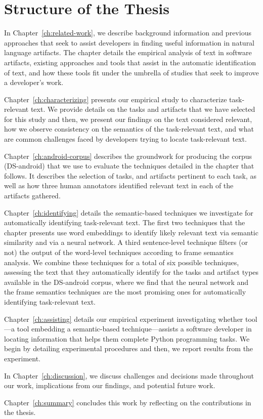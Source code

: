\section{Structure of the Thesis}
\label{cp1:organization}


In Chapter~\ref{ch:related-work}, we describe background information 
and previous approaches that seek to assist developers in 
finding useful information in natural language artifacts. 
The chapter details 
the empirical analysis of text in software artifacts, existing approaches and tools 
that assist in the automatic
identification of text, and how these tools fit under the 
umbrella of studies that seek to 
improve a developer's work.


Chapter~\ref{ch:characterizing} presents our empirical study to characterize task-relevant text.
We provide details on the tasks and artifacts that we have selected for this study
and then, we present our findings on the text considered relevant, 
how we observe consistency on the semantics of the task-relevant text,
and what are common challenges faced by developers trying to locate task-relevant text.


Chapter~\ref{ch:android-corpus} describes the groundwork 
for producing the corpus (\acs{DS-android}) that we use to evaluate the techniques 
detailed in the chapter that follows. It describes the selection of tasks, 
and 
artifacts pertinent to each task,
as well as how three human annotators identified relevant text in each of the artifacts gathered.



Chapter~\ref{ch:identifying} details the semantic-based techniques we investigate for automatically 
identifying task-relevant text.
The first two techniques that the chapter presents 
use word embeddings to identify likely relevant text via semantic similarity
and via a neural network.
A third sentence-level technique filters (or not) 
the output of the word-level techniques according to frame semantics analysis.
We combine these techniques for a total of six possible techniques, 
assessing 
the text that they automatically identify for the tasks and artifact types
available in the \acs{DS-android} corpus,
where we find that the neural network and the frame semantics techniques
are the most promising ones for automatically identifying 
task-relevant text. 




Chapter~\ref{ch:assisting} details our empirical experiment investigating 
whether \acs{tool}---a tool embedding a semantic-based technique---assists a software developer in locating information
that helps them complete Python programming tasks. We begin by detailing experimental procedures
and then, we report results from the experiment.


In Chapter~\ref{ch:discussion}, we discuss challenges and decisions 
made throughout our work, implications from our findings,
and potential future work.


Chapter~\ref{ch:summary} concludes this work by reflecting on the contributions in the thesis. 
